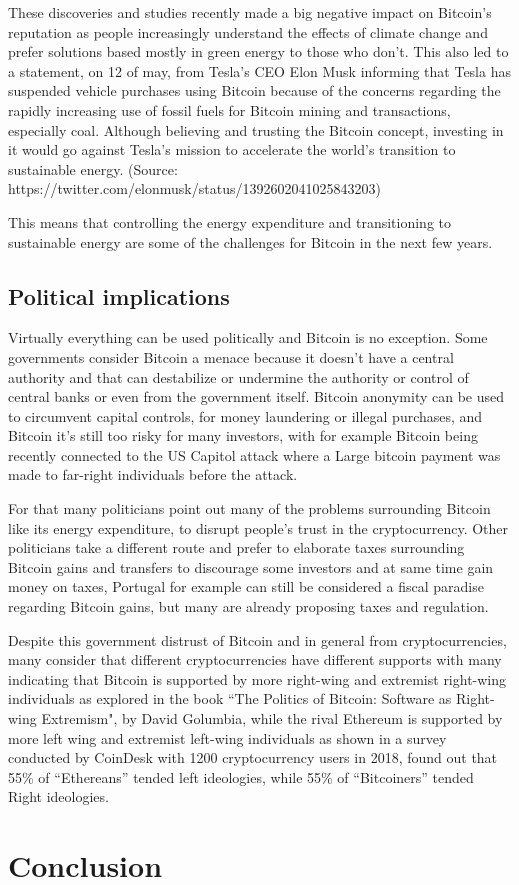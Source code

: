 \documentclass{article}
\begin{document}
These discoveries and studies recently made a big negative impact on Bitcoin's reputation as people increasingly understand the effects of climate change and prefer solutions based mostly in green energy to those who don’t. This also led to a statement, on 12 of may, from Tesla's CEO Elon Musk informing that Tesla has suspended vehicle purchases using Bitcoin because of the concerns regarding the rapidly increasing use of fossil fuels for Bitcoin mining and transactions, especially coal. Although believing and trusting the Bitcoin concept, investing in it would go against Tesla’s mission to accelerate the world’s transition to sustainable energy. (Source: https://twitter.com/elonmusk/status/1392602041025843203)

This means that controlling the energy expenditure and transitioning to sustainable energy are some of the challenges for Bitcoin in the next few years.

\subsection{Political implications}

Virtually everything can be used politically and Bitcoin is no exception. Some governments consider Bitcoin a menace because it doesn't have a central authority and that can destabilize or undermine the authority or control of central banks or even from the government itself. Bitcoin anonymity can be used to circumvent capital controls, for money laundering or illegal purchases, and Bitcoin it’s still too risky for many investors, with for example Bitcoin being recently connected to the US Capitol attack where a Large bitcoin payment was made to far-right individuals before the attack.

For that many politicians point out many of the problems surrounding Bitcoin like its energy expenditure, to disrupt people's trust in the cryptocurrency. Other politicians take a different route and prefer to elaborate taxes surrounding Bitcoin gains and transfers to discourage some investors and at same time gain money on taxes, Portugal for example can still be considered a fiscal paradise regarding Bitcoin gains, but many are already proposing taxes and regulation.

Despite this government distrust of Bitcoin and in general from cryptocurrencies, many consider that different cryptocurrencies have different supports with many indicating that Bitcoin is supported by more right-wing and extremist right-wing individuals as explored in the book “The Politics of Bitcoin: Software as Right-wing Extremism", by David Golumbia, while the rival Ethereum is supported by more left wing and extremist left-wing individuals as shown in a survey conducted by CoinDesk with 1200 cryptocurrency users in 2018, found out that 55\% of “Ethereans” tended left ideologies, while 55\% of “Bitcoiners” tended Right ideologies.

\section{Conclusion}



\newpage

\nocite{*}
\printbibliography
\end{document}
